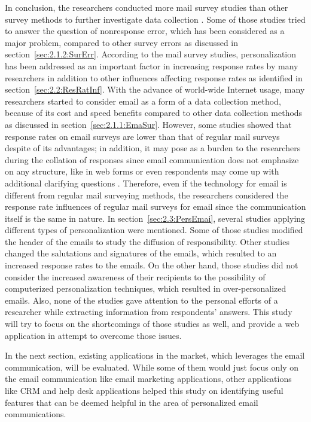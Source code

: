 In conclusion, the researchers conducted more mail survey studies than other survey methods to further investigate data collection \citep{Dillman1991}. Some of those studies tried to answer the question of nonresponse error, which has been considered as a major problem, compared to other survey errors as discussed in section~\ref{sec:2.1.2:SurErr}. According to the mail survey studies, personalization has been addressed as an important factor in increasing response rates by many researchers in addition to other influences affecting response rates as identified in section~\ref{sec:2.2:ResRatInf}. With the advance of world-wide Internet usage, many researchers started to consider email as a form of a data collection method, because of its cost and speed benefits compared to other data collection methods as discussed in section~\ref{sec:2.1.1:EmaSur}. However, some studies showed that response rates on email surveys are lower than that of regular mail surveys despite of its advantages; in addition, it may pose as a burden to the researchers during the collation of responses since email communication does not emphasize on any structure, like in web forms or even respondents may come up with additional clarifying questions \citep{Selm2006}. Therefore, even if the technology for email is different from regular mail surveying methods, the researchers considered the response rate influences of regular mail surveys for email since the communication itself is the same in nature. In section~\ref{sec:2.3:PersEmai}, several studies applying different types of personalization were mentioned. Some of those studies modified the header of the emails to study the diffusion of responsibility. Other studies changed the salutations and signatures of the emails, which resulted to an increased response rates to the emails. On the other hand, those studies did not consider the increased awareness of their recipients to the possibility of computerized personalization techniques, which resulted in over-personalized emails. Also, none of the studies gave attention to the personal efforts of a researcher while extracting information from respondents' answers. This study will try to focus on the shortcomings of those studies as well, and provide a web application in attempt to overcome those issues.
\vspace{1cm}

In the next section, existing applications in the market, which leverages the email communication, will be evaluated. While some of them would just focus only on the email communication like email marketing applications, other applications like \ac{CRM} and help desk applications helped this study on identifying useful features that can be deemed helpful in the area of personalized email communications.


